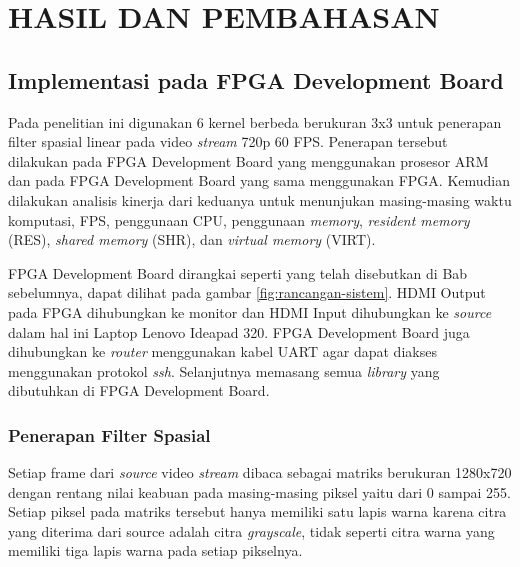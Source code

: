 
\chapter{HASIL DAN PEMBAHASAN}


\section{Implementasi pada FPGA Development Board}

Pada penelitian ini digunakan 6 kernel berbeda berukuran 3x3 untuk penerapan filter spasial linear pada video \textit{stream} 720p 60 FPS. Penerapan tersebut dilakukan pada FPGA Development Board yang menggunakan prosesor ARM dan pada FPGA Development Board yang sama menggunakan FPGA. Kemudian dilakukan analisis kinerja dari keduanya untuk menunjukan masing-masing waktu komputasi, FPS, penggunaan CPU, penggunaan \textit{memory}, \textit{resident memory} (RES), \textit{shared memory} (SHR), dan \textit{virtual memory} (VIRT).

FPGA Development Board dirangkai seperti yang telah disebutkan di Bab sebelumnya, dapat dilihat pada gambar \ref{fig:rancangan-sistem}. HDMI Output pada FPGA dihubungkan ke monitor dan HDMI Input dihubungkan ke \textit{source} dalam hal ini Laptop Lenovo Ideapad 320. FPGA Development Board juga dihubungkan ke \textit{router} menggunakan kabel UART agar dapat diakses menggunakan protokol \textit{ssh}. Selanjutnya memasang semua \textit{library} yang dibutuhkan di FPGA Development Board.

\subsection{Penerapan Filter Spasial}
Setiap frame dari \textit{source} video \textit{stream} dibaca sebagai matriks berukuran 1280x720 dengan rentang nilai keabuan pada masing-masing piksel yaitu dari 0 sampai 255. Setiap piksel pada matriks tersebut hanya memiliki satu lapis warna karena citra yang diterima dari source adalah citra \textit{grayscale}, tidak seperti citra warna yang memiliki tiga lapis warna pada setiap pikselnya. 


